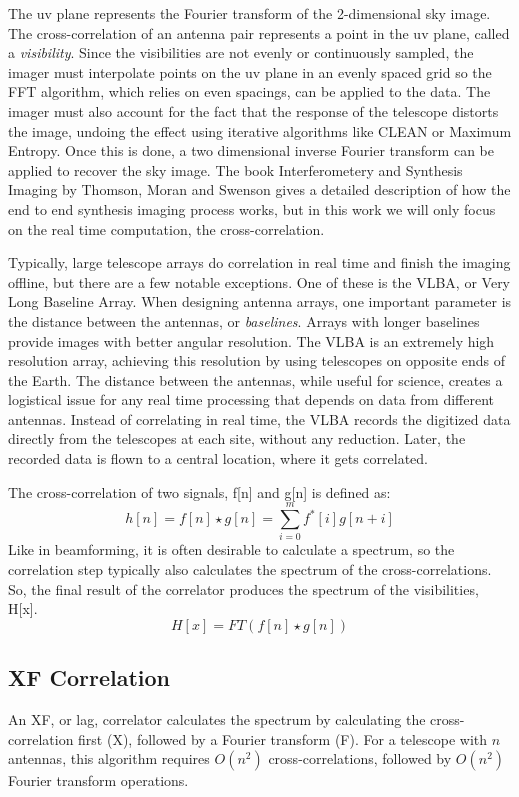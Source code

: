 The uv plane represents the Fourier transform of the 2-dimensional sky image. 
The cross-correlation of an antenna pair represents a point in the uv plane, called a \emph{visibility}. 
Since the visibilities are not evenly or continuously sampled, the imager must interpolate points on the uv plane in an evenly spaced grid so the FFT algorithm, which relies on even spacings, can be applied to the data. 
The imager must also account for the fact that the response of the telescope distorts the image, undoing the effect using iterative algorithms like CLEAN or Maximum Entropy. 
Once this is done, a two dimensional inverse Fourier transform can be applied to recover the sky image. 
The book Interferometery and Synthesis Imaging by Thomson, Moran and Swenson \cite{Thompson:1986ww} gives a detailed description of how the end to end synthesis imaging process works, but in this work we will only focus on the real time computation, the cross-correlation.

Typically, large telescope arrays do correlation in real time and finish the imaging offline, but there are a few notable exceptions.
One of these is the VLBA, or Very Long Baseline Array. 
When designing antenna arrays, one important parameter is the distance between the antennas, or \emph{baselines}. 
Arrays with longer baselines provide images with better angular resolution. 
The VLBA is an extremely high resolution array, achieving this resolution by using telescopes on opposite ends of the Earth. 
The distance between the antennas, while useful for science, creates a logistical issue for any real time processing that depends on data from different antennas. 
Instead of correlating in real time, the VLBA records the digitized data directly from the telescopes at each site, without any reduction.
Later, the recorded data is flown to a central location, where it gets correlated.

The cross-correlation of two signals, f[n] and g[n] is defined as:
\[h[n] = f[n]\star g[n] = \sum_{i=0}^m f^*[i]g[n+i]\]
Like in beamforming, it is often desirable to calculate a spectrum, so the correlation step typically also calculates the spectrum of the cross-correlations. 
So, the final result of the correlator produces the spectrum of the visibilities, H[x].
\[H[x] = FT(f[n]\star g[n])\]


\subsection{XF Correlation}
An XF, or lag, correlator calculates the spectrum by calculating the cross-correlation first (X), followed by a Fourier transform (F).
For a telescope with $n$ antennas, this algorithm requires $O(n^2)$ cross-correlations, followed by $O(n^2)$ Fourier transform operations.

